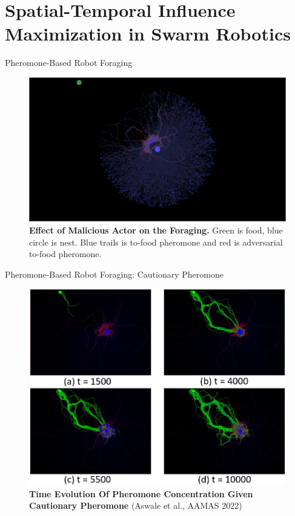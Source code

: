 \documentclass[10pt]{beamer}
\begin{document}
\section{Spatial-Temporal Influence Maximization in Swarm Robotics}
\begin{frame}{Pheromone-Based Robot Foraging}
\begin{figure}
    \centering
    \includegraphics[width=1\linewidth]{DetractorWall.png}
    \caption{\textbf{Effect of Malicious Actor on the Foraging.} Green is food, blue circle is nest. Blue trails is to-food pheromone and red is adversarial to-food pheromone.}
    \label{fig:2}
\end{figure}
\end{frame}
\begin{frame}{Pheromone-Based Robot Foraging: Cautionary Pheromone}
\begin{figure}
    \centering
    \includegraphics[width=0.8\linewidth]{counter_timeline.png}
    \caption{\textbf{Time Evolution Of Pheromone Concentration Given Cautionary Pheromone} (Aswale et al., AAMAS 2022)}
    \label{fig:2}
\end{figure}
\end{frame}
\end{document}

